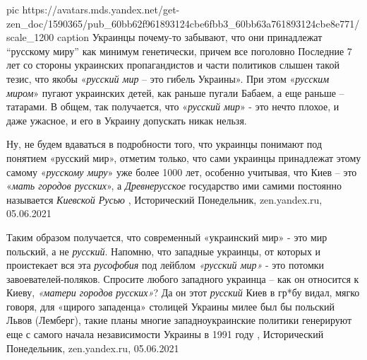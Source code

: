 \ifcmt
	pic https://avatars.mds.yandex.net/get-zen_doc/1590365/pub_60bb62f961893124cbe6fbb3_60bb63a761893124cbe8e771/scale_1200
  caption Украинцы почему-то забывают, что они принадлежат \enquote{русскому миру} как минимум генетически, причем все поголовно
\fi
Последние 7 лет со стороны украинских пропагандистов и части политиков слышен
такой тезис, что якобы «\emph{русский мир} – это гибель Украины». При этом
«\emph{русским миром}» пугают украинских детей, как раньше пугали Бабаем, а еще раньше
– татарами. В общем, так получается, что «\emph{русский мир}» - это нечто
плохое, и даже ужасное, и его в Украину допускать никак нельзя.

Ну, не будем вдаваться в подробности того, что украинцы понимают под понятием
«русский мир», отметим только, что сами украинцы принадлежат этому самому
«\emph{русскому миру}» уже более 1000 лет, особенно учитывая, что Киев – это
«\emph{мать городов русских}», а \emph{Древнерусское} государство ими самими
постоянно называется \emph{Киевской Русью}
, 
Исторический Понедельник, zen.yandex.ru, 05.06.2021 

Таким образом получается, что современный «украинский мир» - это мир польский,
а не \emph{русский}. Напомню, что западные украинцы, от которых и проистекает
вся эта \emph{русофобия} под лейблом \emph{«русский мир»} - это потомки
завоевателей-поляков. Спросите любого западного украинца – как он относится к
Киеву, \emph{«матери городов русских»}? Да он этот \emph{русский} Киев в гр*бу
видал, мягко говоря, для «щирого западенца» столицей Украины милее был бы
польский Львов (Лемберг), такие планы многие западноукраинские политики
генерируют еще с самого начала независимости Украины в 1991 году
, 
Исторический Понедельник, zen.yandex.ru, 05.06.2021 

